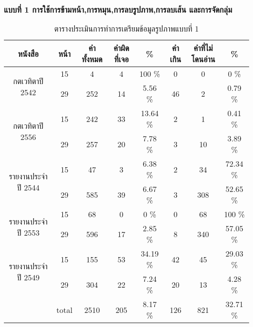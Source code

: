 \subsubsection{แบบที่ 1 การใช้การข้ามหน้า,การหมุน,การลบรูปภาพ,การลบเส้น และการจัดกลุ่ม}
\begin{table}[H]
    \caption{ตารางประเมินการทำการเตรียมข้อมูลรูปภาพแบบที่ 1 }\label{tbl:imagep1}
    \begin{tabular}{|c|c|c|c|c|c|c|c|}
        \hline
        หนังสือ                             & หน้า  & คำทั้งหมด & คำผิดที่เจอ & \%    & คำเกิน & คำที่ไม่โดนอ่าน & \%    \\ \hline
        \multirow{2}{*}{กตเวทิตาปี 2542}    & 15    & 4         & 4           & 100 \%  & 0      & 0               & 0 \%    \\ \cline{2-8} 
                                            & 29    & 252       & 14          & 5.56 \%  & 46     & 2               & 0.79 \% \\ \hline
        \multirow{2}{*}{กตเวทิตาปี 2556}    & 15    & 242       & 33          & 13.64 \% & 2      & 1               & 0.41 \% \\ \cline{2-8} 
                                            & 29    & 257       & 20          & 7.78 \% & 3      & 10              & 3.89 \% \\ \hline
        \multirow{2}{*}{รายงานประจำปี 2544} & 15    & 47        & 3           & 6.38 \% & 2      & 34              & 72.34 \% \\ \cline{2-8} 
                                            & 29    & 585       & 39          & 6.67 \% & 3      & 308             & 52.65 \% \\ \hline
        \multirow{2}{*}{รายงานประจำปี 2553} & 15    & 68        & 0           & 0 \%    & 0      & 68              & 100 \%  \\ \cline{2-8} 
                                            & 29    & 596       & 17          & 2.85 \% & 8      & 340             & 57.05 \% \\ \hline
        \multirow{2}{*}{รายงานประจำปี 2549} & 15    & 155       & 53          & 34.19 \% & 42     & 45              & 29.03 \% \\ \cline{2-8} 
                                            & 29    & 304       & 22          & 7.24 \% & 20     & 13              & 4.28 \%\\ \hline
        \multicolumn{1}{|l|}{}              & total & 2510      & 205         & 8.17 \% & 126    & 821             & 32.71 \% \\ \hline
        \end{tabular}
        \end{table}

